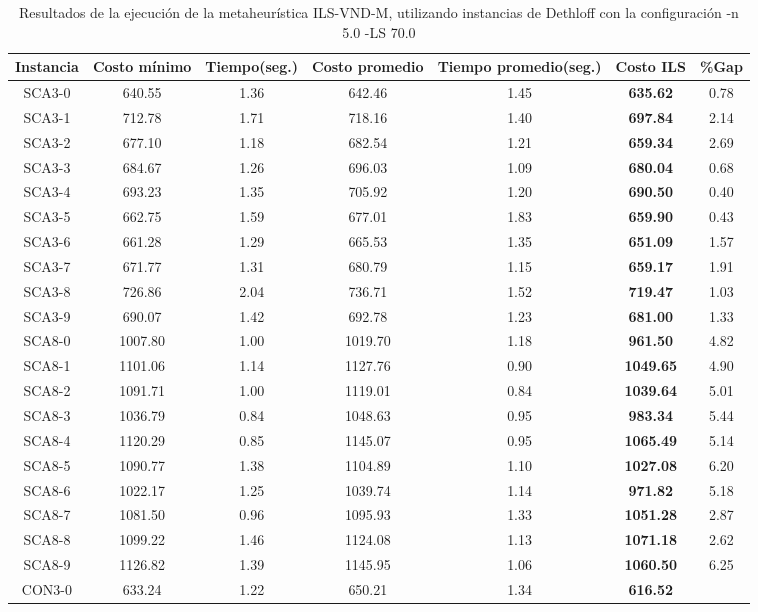 \begin{table}[h]
\caption{Resultados de la ejecución de la metaheurística ILS-VND-M, utilizando instancias de Dethloff con la configuración -n 5.0 -LS 70.0}
\centering
\small
\begin{tabular}{c c c c c c c}
\hline\hline
Instancia & Costo mínimo & Tiempo(seg.) & Costo promedio & Tiempo promedio(seg.) & Costo ILS & \%Gap \\ [0.5ex]
\hline
SCA3-0 & 640.55 & 1.36 & 
642.46 & 1.45 & \bf{635.62} & 
0.78\\SCA3-1 & 712.78 & 1.71 & 
718.16 & 1.40 & \bf{697.84} & 
2.14\\SCA3-2 & 677.10 & 1.18 & 
682.54 & 1.21 & \bf{659.34} & 
2.69\\SCA3-3 & 684.67 & 1.26 & 
696.03 & 1.09 & \bf{680.04} & 
0.68\\SCA3-4 & 693.23 & 1.35 & 
705.92 & 1.20 & \bf{690.50} & 
0.40\\SCA3-5 & 662.75 & 1.59 & 
677.01 & 1.83 & \bf{659.90} & 
0.43\\SCA3-6 & 661.28 & 1.29 & 
665.53 & 1.35 & \bf{651.09} & 
1.57\\SCA3-7 & 671.77 & 1.31 & 
680.79 & 1.15 & \bf{659.17} & 
1.91\\SCA3-8 & 726.86 & 2.04 & 
736.71 & 1.52 & \bf{719.47} & 
1.03\\SCA3-9 & 690.07 & 1.42 & 
692.78 & 1.23 & \bf{681.00} & 
1.33\\SCA8-0 & 1007.80 & 1.00 & 
1019.70 & 1.18 & \bf{961.50} & 
4.82\\SCA8-1 & 1101.06 & 1.14 & 
1127.76 & 0.90 & \bf{1049.65} & 
4.90\\SCA8-2 & 1091.71 & 1.00 & 
1119.01 & 0.84 & \bf{1039.64} & 
5.01\\SCA8-3 & 1036.79 & 0.84 & 
1048.63 & 0.95 & \bf{983.34} & 
5.44\\SCA8-4 & 1120.29 & 0.85 & 
1145.07 & 0.95 & \bf{1065.49} & 
5.14\\SCA8-5 & 1090.77 & 1.38 & 
1104.89 & 1.10 & \bf{1027.08} & 
6.20\\SCA8-6 & 1022.17 & 1.25 & 
1039.74 & 1.14 & \bf{971.82} & 
5.18\\SCA8-7 & 1081.50 & 0.96 & 
1095.93 & 1.33 & \bf{1051.28} & 
2.87\\SCA8-8 & 1099.22 & 1.46 & 
1124.08 & 1.13 & \bf{1071.18} & 
2.62\\SCA8-9 & 1126.82 & 1.39 & 
1145.95 & 1.06 & \bf{1060.50} & 
6.25\\CON3-0 & 633.24 & 1.22 & 
650.21 & 1.34 & \bf{616.52} & 

\end{tabular}
\end{table}
